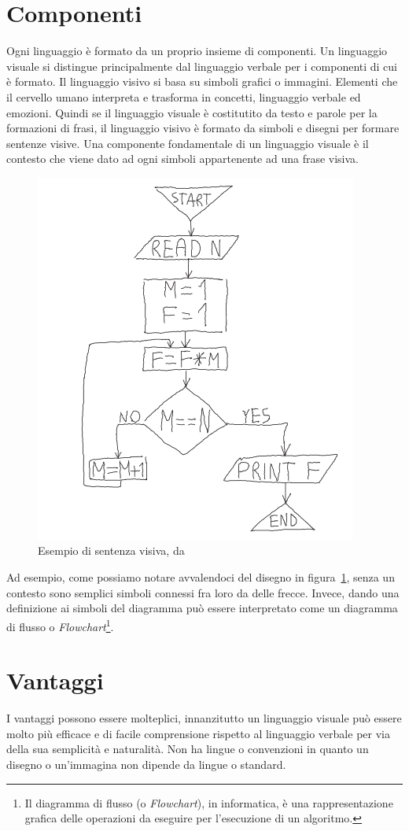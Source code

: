     \section{Componenti}
        Ogni linguaggio è formato da un proprio insieme di componenti. Un linguaggio visuale si distingue principalmente dal linguaggio verbale per i componenti di cui è formato. Il linguaggio visivo si basa su simboli grafici o immagini. Elementi che il cervello umano interpreta e trasforma in concetti, linguaggio verbale ed emozioni. Quindi se il linguaggio visuale è costitutito da testo e parole per la formazioni di frasi, il linguaggio visivo è formato da simboli e disegni per formare sentenze visive.
        Una componente fondamentale di un linguaggio visuale è il contesto che viene dato ad ogni simboli appartenente ad una frase visiva.
        \newline
        \begin{figure}[htbp]
            \centering
            \includegraphics[scale=0.6]{Figure/diagram.PNG}
            \caption{Esempio di sentenza visiva, da~\cite{localcontext_recognition}}
            \label{fig:diagram}
        \end{figure}
        \newline
        Ad esempio, come possiamo notare avvalendoci del disegno in figura~\ref{fig:diagram}, senza un contesto sono semplici simboli connessi fra loro da delle frecce. Invece, dando una definizione ai simboli del diagramma può essere interpretato come un diagramma di flusso o \textit{Flowchart}\footnote{Il diagramma di flusso (o \textit{Flowchart}), in informatica, è una rappresentazione grafica delle operazioni da eseguire per l'esecuzione di un algoritmo.}.

    \section{Vantaggi}
        I vantaggi possono essere molteplici, innanzitutto un linguaggio visuale può essere molto più efficace e di facile comprensione rispetto al linguaggio verbale per via della sua semplicità e naturalità. Non ha lingue o convenzioni in quanto un disegno o un'immagina non dipende da lingue o standard.